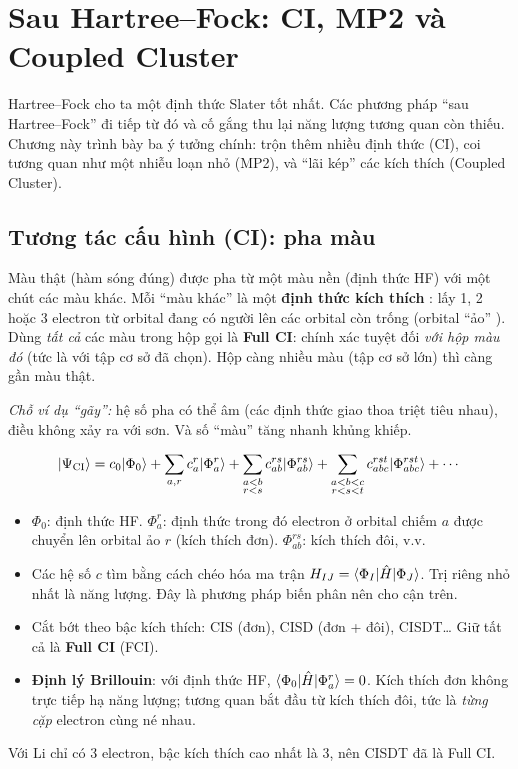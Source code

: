 \chapter{Sau Hartree--Fock: CI, MP2 và Coupled Cluster}
\label{ch:sauhf}

Hartree--Fock cho ta một định thức Slater tốt nhất. Các phương pháp ``sau Hartree--Fock''  đi tiếp từ đó và cố gắng thu lại năng lượng tương quan còn thiếu. Chương này trình bày ba ý tưởng chính: trộn thêm nhiều định thức (CI), coi tương quan như một nhiễu loạn nhỏ (MP2), và ``lãi kép'' các kích thích (Coupled Cluster).

\section{Tương tác cấu hình (CI): pha màu}

\begin{eli5}
Màu thật (hàm sóng đúng) được pha từ một màu nền (định thức HF) với một chút các màu khác. Mỗi ``màu khác'' là một \textbf{định thức kích thích} : lấy 1, 2 hoặc 3 electron từ orbital đang có người lên các orbital còn trống (orbital ``ảo'' ). Dùng \emph{tất cả} các màu trong hộp gọi là \textbf{Full CI}: chính xác tuyệt đối \emph{với hộp màu đó} (tức là với tập cơ sở đã chọn). Hộp càng nhiều màu (tập cơ sở lớn) thì càng gần màu thật.

\emph{Chỗ ví dụ ``gãy'':} hệ số pha có thể âm (các định thức giao thoa triệt tiêu nhau), điều không xảy ra với sơn. Và số ``màu'' tăng nhanh khủng khiếp.
\end{eli5}

\begin{congthuc}
\[
|\Psi_{\rm CI}\rangle=c_0|\Phi_0\rangle+\sum_{a,r}c_a^r|\Phi_a^r\rangle+\sum_{\substack{a<b\\ r<s}}c_{ab}^{rs}|\Phi_{ab}^{rs}\rangle+\sum_{\substack{a<b<c\\ r<s<t}}c_{abc}^{rst}|\Phi_{abc}^{rst}\rangle+\cdots
\]
\begin{itemize}
\item $\Phi_0$: định thức HF. $\Phi_a^r$: định thức trong đó electron ở orbital chiếm $a$ được chuyển lên orbital ảo $r$ (kích thích đơn). $\Phi_{ab}^{rs}$: kích thích đôi, v.v.
\item Các hệ số $c$ tìm bằng cách chéo hóa ma trận $H_{IJ}=\langle\Phi_I|\hat H|\Phi_J\rangle$. Trị riêng nhỏ nhất là năng lượng. Đây là phương pháp biến phân nên cho cận trên.
\item Cắt bớt theo bậc kích thích: CIS (đơn), CISD (đơn + đôi), CISDT\ldots{} Giữ tất cả là \textbf{Full CI} (FCI).
\item \textbf{Định lý Brillouin}: với định thức HF, $\langle\Phi_0|\hat H|\Phi_a^r\rangle=0$. Kích thích đơn không trực tiếp hạ năng lượng; tương quan bắt đầu từ kích thích đôi, tức là \emph{từng cặp} electron cùng né nhau.
\end{itemize}
Với Li chỉ có 3 electron, bậc kích thích cao nhất là 3, nên CISDT đã là Full CI.
\end{congthuc}

